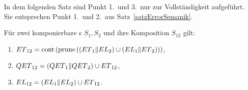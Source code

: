 In dem folgenden Satz sind Punkt 1.\ und 3.\ nur zur Vollständigkeit aufgeführt.
Sie entsprechen Punkt 1.\ und 2.\ aus Satz~\ref{satzErrorSemanik}.

\begin{satz}
\label{satzQuiSemantik}
  Für zwei komponierbare \EIO{}s $S_1, S_2$ und ihre Komposition $S_{12}$ gilt:
  \begin{enumerate}
    \item $ET{}_{12} = \mathrm{cont}{}\left(\mathrm{prune}{}\left(\left(ET{}_1\|EL{}_2\right)\cup
      \left(EL{}_1\|ET{}_2\right)\right)\right)$,
    \item $QET{}_{12} = (QET{}_1\|QET{}_2)\cup ET{}_{12}$,
    \item $EL{}_{12} = (EL{}_1\|EL{}_2)\cup ET{}_{12}$.
  \end{enumerate}
\end{satz}

